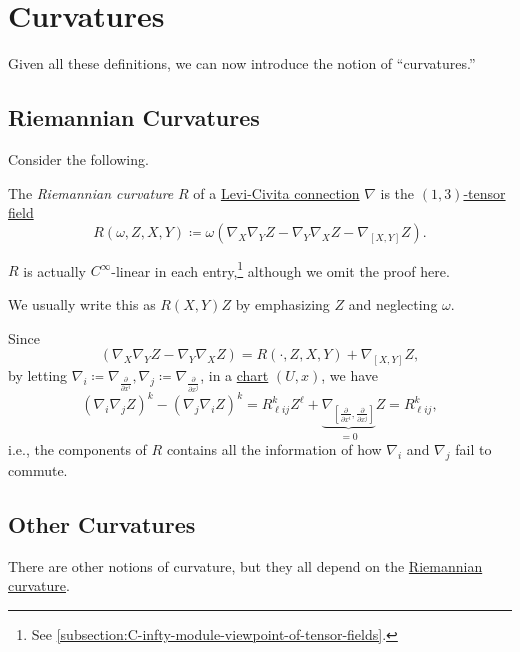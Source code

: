 \section{Curvatures}
Given all these definitions, we can now introduce the notion of ``curvatures.''

\subsection{Riemannian Curvatures}
Consider the following.

\begin{definition}\label{def:Riemannian-curvature}
	The \emph{Riemannian curvature} \(R\) of a \hyperref[def:Levi-Civita-connection]{Levi-Civita connection} \(\nabla \) is the \hyperref[def:tensor-field]{\((1, 3)\)-tensor field}
	\[
		R(\omega , Z, X, Y) \coloneqq \omega \left( \nabla _X \nabla _Y Z - \nabla _Y \nabla _X Z - \nabla _{[X, Y]}Z \right) .
	\]
\end{definition}

\begin{remark}
	\(R\) is actually \(C^{\infty} \)-linear in each entry,\footnote{See \autoref{subsection:C-infty-module-viewpoint-of-tensor-fields}.} although we omit the proof here.
\end{remark}

\begin{notation}
	We usually write this as \(R(X, Y)Z\) by emphasizing \(Z\) and neglecting \(\omega \).
\end{notation}

\begin{remark}
	Since
	\[
		\left( \nabla _X \nabla _Y Z - \nabla _Y \nabla _X Z \right) = R(\cdot, Z, X, Y) + \nabla _{[X, Y]} Z,
	\]
	by letting \(\nabla _i \coloneqq \nabla _{\frac{\partial }{\partial x^i} }, \nabla _j \coloneqq \nabla _{\frac{\partial }{\partial x^j} }\), in a \hyperref[def:coordinate-chart]{chart} \((U, x)\), we have
	\[
		(\nabla _i \nabla _j Z)^k - (\nabla _j \nabla _i Z)^k
		= R^k_{\ell ij} Z^{\ell } + \underbrace{\nabla _{\left[ \frac{\partial }{\partial x^i} , \frac{\partial }{\partial x^j}  \right] }}_{=0} Z
		= R^k_{\ell ij},
	\]
	i.e., the components of \(R\) contains all the information of how \(\nabla _i\) and \(\nabla _j\) fail to commute.
\end{remark}

\subsection{Other Curvatures}
There are other notions of curvature, but they all depend on the \hyperref[def:Riemannian-curvature]{Riemannian curvature}.

